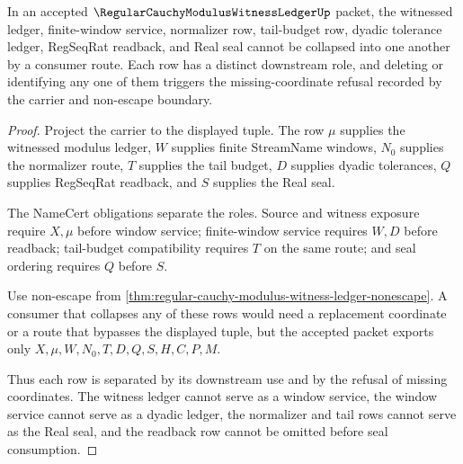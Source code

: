 \begin{theorem}
\label{thm:regular-cauchy-modulus-witness-ledger-field-separation}
In an accepted $\RegularCauchyModulusWitnessLedgerUp$ packet, the witnessed ledger, finite-window service, normalizer row, tail-budget row, dyadic tolerance ledger, RegSeqRat readback, and Real seal cannot be collapsed into one another by a consumer route. Each row has a distinct downstream role, and deleting or identifying any one of them triggers the missing-coordinate refusal recorded by the carrier and non-escape boundary.
\end{theorem}
\begin{proof}
Project the carrier to the displayed tuple. The row $\mu$ supplies the witnessed modulus ledger, $W$ supplies finite StreamName windows, $N_0$ supplies the normalizer route, $T$ supplies the tail budget, $D$ supplies dyadic tolerances, $Q$ supplies RegSeqRat readback, and $S$ supplies the Real seal.

The NameCert obligations separate the roles. Source and witness exposure require $X,\mu$ before window service; finite-window service requires $W,D$ before readback; tail-budget compatibility requires $T$ on the same route; and seal ordering requires $Q$ before $S$.

Use non-escape from \autoref{thm:regular-cauchy-modulus-witness-ledger-nonescape}. A consumer that collapses any of these rows would need a replacement coordinate or a route that bypasses the displayed tuple, but the accepted packet exports only $X,\mu,W,N_0,T,D,Q,S,H,C,P,M$.

Thus each row is separated by its downstream use and by the refusal of missing coordinates. The witness ledger cannot serve as a window service, the window service cannot serve as a dyadic ledger, the normalizer and tail rows cannot serve as the Real seal, and the readback row cannot be omitted before seal consumption.
\end{proof}

